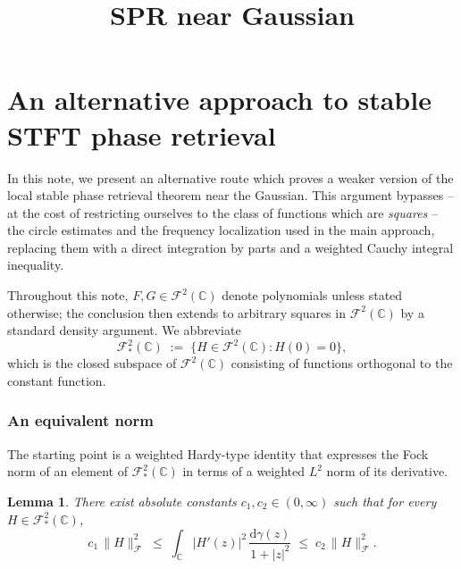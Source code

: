 \documentclass[a4paper,11pt,reqno]{amsart}
\title{SPR near Gaussian}
\numberwithin{equation}{section}
\theoremstyle{plain} %
\newtheorem{lemma}{Lemma}[section]
\theoremstyle{definition} %
\theoremstyle{remark}
\newcommand{\C}{\mathbb{C}}
\newcommand{\abs}[1]{\lvert #1 \rvert}
\newcommand{\norm}[1]{\lVert #1 \rVert}
\newcommand{\dd}{\mathrm{d}}
\begin{document}
\maketitle 


\section{An alternative approach to stable STFT phase retrieval}\label{sec:bochner}
In this note, we present an alternative route which proves a weaker version of the local stable phase retrieval theorem near the Gaussian. This argument bypasses -- at the cost of restricting ourselves to the class of functions which are \emph{squares} -- the circle estimates
and the frequency localization used in the main approach,
replacing them with a direct integration
by parts
and a weighted Cauchy integral inequality. %

\medskip

Throughout this note, $F, G \in \mathcal{F}^2(\C)$ denote polynomials
unless stated otherwise; the conclusion then extends to arbitrary
squares in $\mathcal{F}^2(\C)$ by a standard density argument. We abbreviate
\[
\mathcal{F}^2_\ast(\C) \;:=\; \bigl\{H \in \mathcal{F}^2(\C) : H(0) = 0\bigr\},
\]
which is the closed subspace of $\mathcal{F}^2(\C)$ consisting of functions orthogonal to the constant
function.

\subsubsection{An equivalent norm}\label{sec:weighted-norm}
The starting point is a weighted Hardy-type identity that expresses the
Fock norm of an element of $\mathcal{F}^2_\ast(\C)$ in terms of a weighted
$L^2$ norm of its derivative.

\begin{lemma}\label{lem:weighted-equiv}
There exist absolute constants $c_1, c_2 \in (0,\infty)$ such that for
every $H \in \mathcal{F}^2_\ast(\C)$,
\begin{equation}\label{eq:weighted-equiv}
c_1\, \norm{H}_{\mathcal{F}}^2
\;\le\;
\int_{\C} \abs{H'(z)}^2\, \frac{\dd\gamma(z)}{1+\abs{z}^2}
\;\le\;
c_2\, \norm{H}_{\mathcal{F}}^2.
\end{equation}
\end{lemma}
\end{document}
